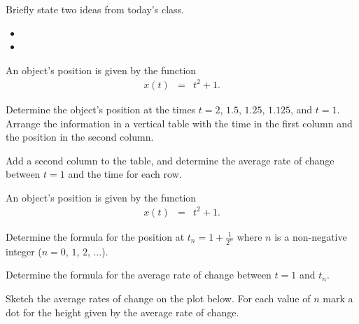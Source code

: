 \begin{problem}
\item Briefly state two ideas from today's class.
  \begin{itemize}
  \item
  \item
  \end{itemize}

  \item An object's position is given by the function
    \begin{eqnarray*}
      x(t) & = & t^2 + 1.
    \end{eqnarray*}

    \begin{subproblem}
    \item Determine the object's position at the times $t=2$, $1.5$,
      $1.25$, $1.125$, and $t=1$. Arrange the information in a
      vertical table with the time in the first column and the
      position in the second column.

      \vfill

    \item Add a second column to the table, and determine the average
      rate of change between $t=1$ and the time for each row.

    \end{subproblem}

    \clearpage

  \item An object's position is given by the function
    \begin{eqnarray*}
      x(t) & = & t^2 + 1.
    \end{eqnarray*}

    \begin{subproblem}
    \item Determine the formula for the position at
      $t_n=1+\frac{1}{2^n}$ where $n$ is a non-negative integer
      ($n=0$, $1$, $2$, $\ldots$).

      \vfill

    \item Determine the formula for the average rate of change between
      $t=1$ and $t_n$.

      \vfill

    \item Sketch the average rates of change on the plot below. For
      each value of $n$ mark a dot for the height given by the average
      rate of change.



\end{subproblem}
\end{problem}
